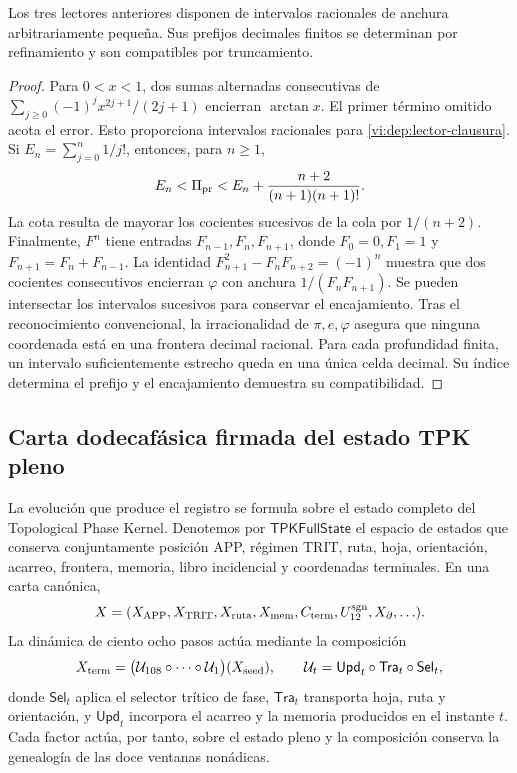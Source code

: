 \begin{proposition}
\label{vi:dep:prefijos}
Los tres lectores anteriores disponen de intervalos racionales de anchura
arbitrariamente pequeña. Sus prefijos decimales finitos se determinan por
refinamiento y son compatibles por truncamiento.
\end{proposition}
\begin{proof}
Para \(0<x<1\), dos sumas alternadas consecutivas de
\(\sum_{j\ge0}(-1)^jx^{2j+1}/(2j+1)\) encierran \(\arctan x\).
El primer término omitido acota el error. Esto proporciona intervalos
racionales para \eqref{vi:dep:lector-clausura}.
Si \(E_n=\sum_{j=0}^n1/j!\), entonces, para \(n\ge1\),
\[
 E_n<\Pi_{\rm pr}<E_n+
 \frac{n+2}{(n+1)(n+1)!}.
\]
La cota resulta de mayorar los cocientes sucesivos de la cola por
\(1/(n+2)\). Finalmente, \(F^n\) tiene entradas
\(F_{n-1},F_n,F_{n+1}\), donde \(F_0=0,F_1=1\) y
\(F_{n+1}=F_n+F_{n-1}\). La identidad
\(F_{n+1}^2-F_nF_{n+2}=(-1)^n\) muestra que dos cocientes consecutivos
encierran \(\varphi\) con anchura \(1/(F_nF_{n+1})\).
Se pueden intersectar los intervalos sucesivos para conservar el
encajamiento. Tras el reconocimiento convencional, la irracionalidad de
\(\pi,e,\varphi\) asegura que ninguna coordenada está en una frontera
decimal racional. Para cada profundidad finita, un intervalo
suficientemente estrecho queda en una única celda decimal. Su índice
determina el prefijo y el encajamiento demuestra su compatibilidad.
\end{proof}

\subsection{Carta dodecafásica firmada del estado TPK pleno}
\label{vi:dep:estado-pleno}

La evolución que produce el registro se formula sobre el estado completo del
Topological Phase Kernel. Denotemos por
\(\mathsf{TPKFullState}\) el espacio de estados que conserva conjuntamente
posición APP, régimen TRIT, ruta, hoja, orientación, acarreo, frontera,
memoria, libro incidencial y coordenadas terminales. En una carta canónica,
\[
 X=(X_{\rm APP},X_{\rm TRIT},X_{\rm ruta},X_{\rm mem},
       C_{\rm term},U_{12}^{\rm sgn},X_{\partial},\ldots).
\]
La dinámica de ciento ocho pasos actúa mediante la composición
\begin{equation}
 X_{\rm term}
 =\bigl(\mathcal U_{108}\circ\cdots\circ\mathcal U_1\bigr)(X_{\rm seed}),
 \qquad
 \mathcal U_t=\mathsf{Upd}_t\circ\mathsf{Tra}_t\circ\mathsf{Sel}_t,
 \label{vi:dep:estado-terminal-108}
\end{equation}
donde \(\mathsf{Sel}_t\) aplica el selector trítico de fase,
\(\mathsf{Tra}_t\) transporta hoja, ruta y orientación, y
\(\mathsf{Upd}_t\) incorpora el acarreo y la memoria producidos en el
instante \(t\). Cada factor actúa, por tanto, sobre el estado pleno y la
composición conserva la genealogía de las doce ventanas nonádicas.

